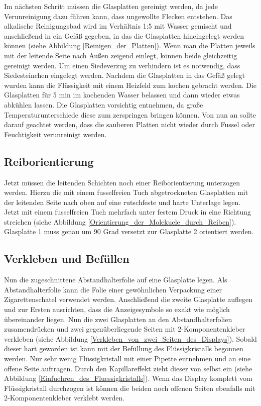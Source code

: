 Im nächsten Schritt müssen die Glasplatten gereinigt werden, da jede Verunreinigung dazu führen kann, dass ungewollte Flecken entstehen.
Das alkalische Reinigungsbad wird im Verhältnis 1:5 mit Wasser gemischt und anschließend in ein Gefäß gegeben, in das die Glasplatten hineingelegt werden können (siehe Abbildung \ref{Reinigen_der_Platten}). Wenn man die Platten jeweils mit der leitende Seite nach Außen zeigend einlegt, können beide gleichzeitig gereinigt werden. Um einen Siedeverzug zu verhindern ist es notwendig, dass Siedesteinchen eingelegt werden. Nachdem die Glasplatten in das Gefäß gelegt wurden kann die Flüssigkeit mit einem Heizfeld zum kochen gebracht werden. Die Glasplatten für 5 min im kochenden Wasser belassen und dann wieder etwas abkühlen lassen. Die Glasplatten vorsichtig entnehmen, da große Temperaturunterschiede diese zum zerspringen bringen können.
Von nun an sollte darauf geachtet werden, dass die sauberen Platten nicht wieder durch Fussel oder Feuchtigkeit verunreinigt werden.

\subsection{Reiborientierung}

Jetzt müssen die leitenden Schichten noch einer Reiborientierung unterzogen werden. Hierzu die mit einem fusselfreien Tuch abgetrockneten Glasplatten mit der leitenden Seite nach oben auf eine rutschfeste und harte Unterlage legen. Jetzt mit einem fusselfreien Tuch mehrfach unter festem Druck in eine Richtung streichen (siehe Abbildung \ref{Orientierung_der_Molekuele_durch_Reiben}). Glasplatte 1 muss genau um 90 Grad versetzt zur Glasplatte 2 orientiert werden.

\subsection{Verkleben und Befüllen}

Nun die zugeschnittene Abstandhalterfolie auf eine Glasplatte legen. Als Abstandhalterfolie kann die Folie einer gewöhnlichen Verpackung einer Zigarettenschatel verwendet werden. 
Anschließend die zweite Glasplatte auflegen und zur Ersten ausrichten, dass die Anzeigesymbole so exakt wie möglich übereinander liegen. Nun die zwei Glasplatten an den Abstandhalterfolien zusamendrücken und zwei gegenüberliegende Seiten mit 2-Komponentenkleber verkleben (siehe Abbildung \ref{Verkleben_von_zwei_Seiten_des_Displays}). Sobald dieser hart geworden ist kann mit der Befüllung des Flüssigkristalls begonnen werden.
Nur sehr wenig Flüssigkristall mit einer Pipette entnehmen und an eine offene Seite auftragen. Durch den Kapillareffekt zieht dieser von selbst ein (siehe Abbildung \ref{Einfuehren_des_Fluessigkristalls}). Wenn das Display komplett vom Flüssigkristall durchzogen ist können die beiden noch offenen Seiten ebenfalls mit 2-Komponentenkleber verklebt werden.\\

